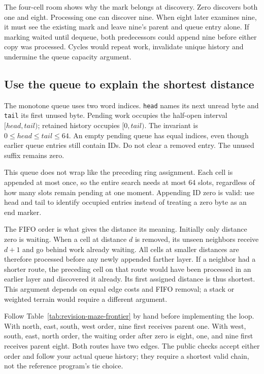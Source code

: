 The four-cell room shows why the mark belongs at discovery. Zero discovers both
one and eight.
Processing one can discover nine. When eight later examines nine, it must see the
existing mark and leave nine's parent and queue entry alone. If marking waited
until dequeue, both predecessors could append nine before either copy was
processed. Cycles would repeat work, invalidate unique history and undermine the
queue capacity argument.

\subsection*{Use the queue to explain the shortest distance}

The monotone queue uses two word indices. \texttt{head} names its next unread
byte and \texttt{tail} its first unused byte. Pending work occupies the half-open
interval $[head,tail)$; retained history occupies $[0,tail)$. The invariant is
$0\leq head\leq tail\leq64$. An empty pending queue has equal indices, even
though earlier queue entries still contain IDs. Do not clear a removed entry.
The unused suffix remains zero.

This queue does not wrap like the preceding ring assignment. Each cell is
appended at most once, so the entire search needs at most 64 slots, regardless
of how many slots remain pending at one moment. Appending ID zero is valid:
use head and tail to identify occupied entries instead of treating a zero byte
as an end marker.

The FIFO order is what gives the distance its meaning. Initially only distance
zero is waiting. When a cell at distance $d$ is removed, its unseen neighbors
receive $d+1$ and go behind work already waiting. All cells at smaller distances
are therefore processed before any newly appended farther layer. If a neighbor
had a shorter route, the preceding cell on that route would have been processed
in an earlier layer and discovered it already. Its first assigned distance is
thus shortest. This argument depends on equal edge costs and FIFO removal;
a stack or weighted terrain would require a different argument.




Follow Table~\ref{tab:revision-maze-frontier} by hand before implementing the
loop. With north, east, south, west order, nine first receives parent one.
With west, south, east, north order, the waiting order after zero is eight, one,
and nine first receives parent eight. Both routes have two edges. The public
checks accept either order and follow your actual queue history; they require a
shortest valid chain, not the reference program's tie choice.

